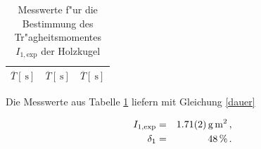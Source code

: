 				\begin{table}[h!]
					\begin{center}
						\caption{Messwerte f"ur die Bestimmung des Tr"agheitsmomentes $I_\mathrm{1, exp}$ der Holzkugel \label{tabelle:kugel}}
						\begin{tabular}{|c||c||c|}
							\hline
							$\overline{T} [\SI{}{\second}]$ & $\overline{T} [\SI{}{\second}]$ & $\overline{T} [\SI{}{\second}]$ \\
							\hline 
							\hline
							
							\hline 
						\end{tabular}
					\end{center}
				\end{table}

				Die Messwerte aus Tabelle \ref{tabelle:kugel} liefern mit Gleichung \eqref{dauer}

				\begin{eqnarray*}
					I_\mathrm{1, exp} & = & \SI{1.71 (2)}{\gram \meter \squared} \,, \\
					\delta_1 & = & \SI{48}{\percent} \,.
				\end{eqnarray*}

			\clearpage
